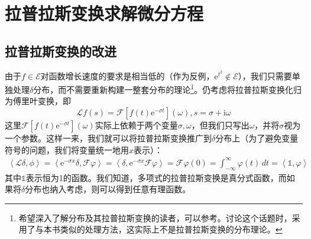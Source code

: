 \section{拉普拉斯变换求解微分方程}\label{sec:Laplace_ODE}

\subsection{拉普拉斯变换的改进}\label{sub:improvement_of_laplace}

由于$f\in\mathcal{E}$对函数增长速度的要求是相当低的（作为反例，$\mathrm{e}^{t^2}\notin\mathcal{E}$），我们只需要单独处理$\delta$分布，而不需要重新构建一整套分布的理论\footnote{希望深入了解分布及其拉普拉斯变换的读者，可以参考\cite{Laplace_Distribution}。\cite{distribution}讨论这个话题时，采用了与本书类似的处理方法，这实际上不是拉普拉斯变换的分布理论。}。仍考虑将拉普拉斯变换化归为傅里叶变换，即
\[\mathcal{L} f(s)=\mathcal{F} [f(t)\mathrm{e}^{-\sigma t}](\omega),s=\sigma+\mathrm{i}\omega\]
这里$\mathcal{F} [f(t)\mathrm{e}^{-\sigma t}](\omega)$实际上依赖于两个变量$\sigma,\omega$，但我们只写出$\omega$，并将$\sigma$视为一个参数\cite{distribution}。这样一来，我们就可以将拉普拉斯变换推广到$\delta$分布上（为了避免变量符号的问题，我们将变量统一地用$x$表示）：
\begin{align*}
    \left\langle \mathcal{L}\delta,\phi\right\rangle=\left\langle \mathrm{e}^{-\sigma x}\delta,\mathcal{F} \varphi\right\rangle=\left\langle \delta,\mathrm{e}^{-\sigma x}\mathcal{F} \varphi\right\rangle=\mathcal{F}\varphi(0)=\int_{-\infty}^{\infty}\varphi(t)\,dt=\left\langle \mathds{1},\varphi\right\rangle
\end{align*}
其中$\mathds{1}$表示恒为1的函数。我们知道，多项式的拉普拉斯变换是真分式函数，而如果将$\delta$分布也纳入考虑，则可以得到任意有理函数。

